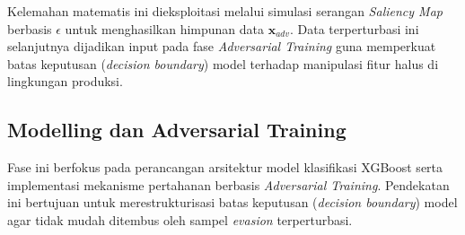 \documentclass[11pt, a4paper]{article}
\begin{document}
Kelemahan matematis ini dieksploitasi melalui simulasi serangan \textit{Saliency Map} berbasis $\epsilon$ untuk menghasilkan himpunan data $\mathbf{x}_{adv}$. Data terperturbasi ini selanjutnya dijadikan input pada fase \textit{Adversarial Training} guna memperkuat batas keputusan (\textit{decision boundary}) model terhadap manipulasi fitur halus di lingkungan produksi.


\subsection{Modelling dan Adversarial Training}
Fase ini berfokus pada perancangan arsitektur model klasifikasi XGBoost serta implementasi mekanisme pertahanan berbasis \textit{Adversarial Training}. Pendekatan ini bertujuan untuk merestrukturisasi batas keputusan (\textit{decision boundary}) model agar tidak mudah ditembus oleh sampel \textit{evasion} terperturbasi.
\end{document}
